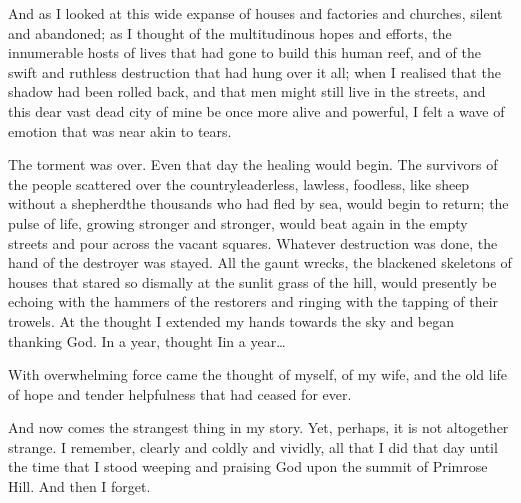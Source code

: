 And as I looked at this wide expanse of houses and factories and
churches, silent and abandoned; as I thought of the multitudinous
hopes and efforts, the innumerable hosts of lives that had gone to
build this human reef, and of the swift and ruthless destruction
that had hung over it all; when I realised that the shadow had been
rolled back, and that men might still live in the streets, and this
dear vast dead city of mine be once more alive and powerful, I felt
a wave of emotion that was near akin to tears.

The torment was over. Even that day the healing would begin. The
survivors of the people scattered over the country\dash{}leaderless,
lawless, foodless, like sheep without a shepherd\dash{}the thousands who
had fled by sea, would begin to return; the pulse of life, growing
stronger and stronger, would beat again in the empty streets and
pour across the vacant squares. Whatever destruction was done, the
hand of the destroyer was stayed. All the gaunt wrecks, the
blackened skeletons of houses that stared so dismally at the sunlit
grass of the hill, would presently be echoing with the hammers of
the restorers and ringing with the tapping of their trowels. At the
thought I extended my hands towards the sky and began thanking God.
In a year, thought I\dash{}in a year\ldots{}

With overwhelming force came the thought of myself, of my wife, and
the old life of hope and tender helpfulness that had ceased for
ever.

And now comes the strangest thing in my story. Yet, perhaps, it is
not altogether strange. I remember, clearly and coldly and vividly,
all that I did that day until the time that I stood weeping and
praising God upon the summit of Primrose Hill. And then I forget.

